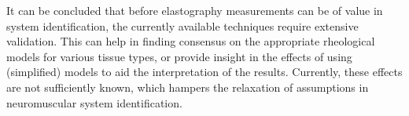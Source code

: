 It can be concluded that before elastography measurements can be of value in system identification, the currently available techniques require extensive validation. This can help in finding consensus on the appropriate rheological models for various tissue types, or provide insight in the effects of using (simplified) models to aid the interpretation of the results. Currently, these effects are not sufficiently known, which hampers the relaxation of assumptions in neuromuscular system identification. 



%
%
%
%
%


















